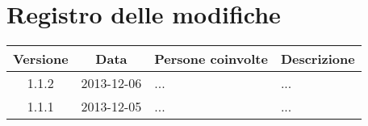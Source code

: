 \section*{Registro delle modifiche}

\small{
\begin{tabularx}{\textwidth}{|c|c|l|X|}
 \hline \textbf{Versione} & \textbf{Data} & \textbf{Persone coinvolte} & \textbf{Descrizione} \\

 
 \hline 1.1.2 & 2013-12-06 & ... &
 ...\\
 
 \hline 1.1.1 & 2013-12-05 & ... &
 ...\\
 
 \hline
\end{tabularx}
}